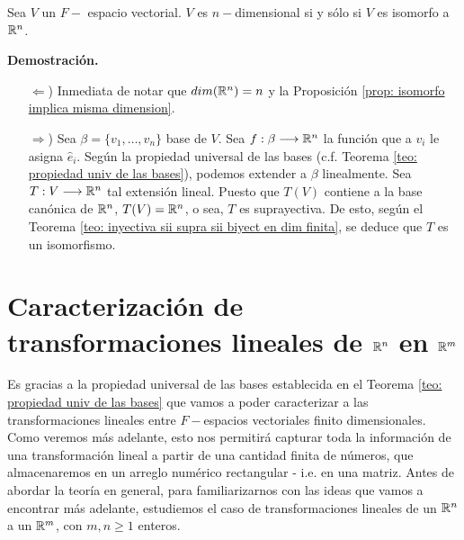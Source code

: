 \begin{prop}
	\label{prop: dim V n sii V isomorfo a Rn}
Sea $V$ un $F-$ espacio vectorial. $V$ es $n-$dimensional
si y sólo si $V$ es isomorfo a $\mathbb{R}^{n}$.
\end{prop}
\noindent
\textbf{Demostración.}
\begin{itemize}
	\item[$\Leftarrow$)] Inmediata de notar que $dim(\mathbb{R}^{n}) = n$
	y la Proposición \ref{prop: isomorfo implica misma dimension}.
	\item[$\Rightarrow$)] Sea $\beta = \{ v_{1}, \ldots , v_{n} \}$
	base de $V$. Sea $f: \beta \longrightarrow \mathbb{R}^{n}$ la función
	que a $v_{i}$ le asigna $\hat{e}_{i}$. Según la propiedad 
	universal de las bases (c.f. Teorema 
	\ref{teo: propiedad univ de las bases}), podemos extender
	a $\beta$ linealmente. Sea $T: V \longrightarrow \mathbb{R}^{n}$ 
	tal extensión lineal. Puesto que $T(V)$ contiene a la 
	base canónica de $\mathbb{R}^{n}$, $T(V) = \mathbb{R}^{n}$, o sea,
	$T$ es suprayectiva. De esto, según el Teorema 
	\ref{teo: inyectiva sii supra sii biyect en dim finita}, se
	deduce que $T$ es un isomorfismo.
\end{itemize}
\QEDB
\vspace{0.2cm}

\section{Caracterización de transformaciones lineales de $\mathbb{R}^{n}$ en $\mathbb{R}^{m}$}
Es gracias a la propiedad universal de las bases establecida
en el Teorema \ref{teo: propiedad univ de las bases}
que vamos a poder caracterizar a las transformaciones lineales
entre $F-$espacios vectoriales finito
dimensionales. Como veremos más adelante, esto nos permitirá 
capturar toda la información de una transformación lineal a partir
de una cantidad finita de números, que almacenaremos en un arreglo
numérico rectangular - i.e. en una matriz.
Antes de abordar la teoría en general, para familiarizarnos
con las ideas que vamos a encontrar más adelante, estudiemos 
el caso de transformaciones lineales de un $\mathbb{R}^{n}$
a un $\mathbb{R}^{m}$, con $m, n \geq 1$ enteros.


